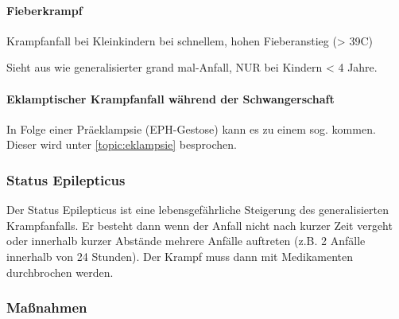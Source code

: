 \paragraph{Fieberkrampf}\label{topic:fieberkrampf}

Krampfanfall bei Kleinkindern bei schnellem, hohen Fieberanstieg
({\textgreater} 39{\textdegree}C)

Sieht aus wie generalisierter grand mal-Anfall, NUR bei
Kindern {\textless} 4 Jahre.

\paragraph{Eklamptischer Krampfanfall während der
Schwangerschaft} In Folge einer Präeklampsie (EPH-Gestose)
kann es zu einem sog. 
kommen. Dieser wird unter \ref{topic:eklampsie}
besprochen.

\subsubsection{Status Epilepticus}
Der Status Epilepticus ist eine
lebensgefährliche Steigerung
des generalisierten Krampfanfalls. Er besteht dann wenn der
Anfall nicht nach kurzer Zeit vergeht oder innerhalb kurzer
Abstände mehrere Anfälle auftreten (z.B. 2 Anfälle innerhalb
von 24 Stunden). Der Krampf muss dann mit Medikamenten
durchbrochen werden.


\subsubsection{Maßnahmen}

